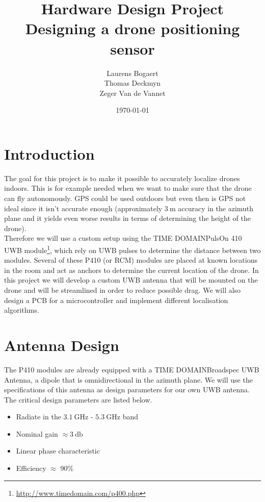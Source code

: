 \documentclass[a4paper]{article}        %
\title{Hardware Design Project\\ Designing a drone positioning sensor}
\author{Laurens Bogaert\\Thomas Deckmyn\\Zeger Van de Vannet}
\date{\today}
\begin{document}
\maketitle

\newpage
  \tableofcontents
\newpage

\section{Introduction}

The goal for this project is to make it possible to accurately localize drones indoors. This is for example needed when we want to make sure that the drone can fly autonomously. GPS could be used outdoors but even then is GPS not ideal since it isn't accurate enough (approximately $\SI{3}{\meter}$ accuracy in the azimuth plane and it yields even worse results in terms of determining the height of the drone). \\
Therefore we will use a custom setup using the TIME DOMAIN\texttrademark PulsOn 410 UWB module\footnote{\url{http://www.timedomain.com/p400.php}}, which rely on UWB pulses to determine the distance between two modules. Several of these P410 (or RCM) modules are placed at known locations in the room and act as anchors to determine the current location of the drone. In this project we will develop a custom UWB antenna that will be mounted on the drone and will be streamlined in order to reduce possible drag. We will also design a PCB for a microcontroller and implement different localisation algorithms.

\section{Antenna Design}
	
	 The P410 modules are already equipped with a TIME DOMAIN\texttrademark Broadspec UWB Antenna, a dipole that is omnidirectional in the azimuth plane. We will use the specifications of this antenna as design parameters for our own UWB antenna. The critical design parameters are listed below. 

	\begin{itemize}
		\item Radiate in the $\SI{3.1}{\giga\hertz}$ - $\SI{5.3}{\giga\hertz}$ band
		\item Nominal gain $\approx \SI{3}{\decibel}$
		\item Linear phase characteristic
		\item Efficiency $\approx$ 90\%	

	\end{itemize}
\end{document}
